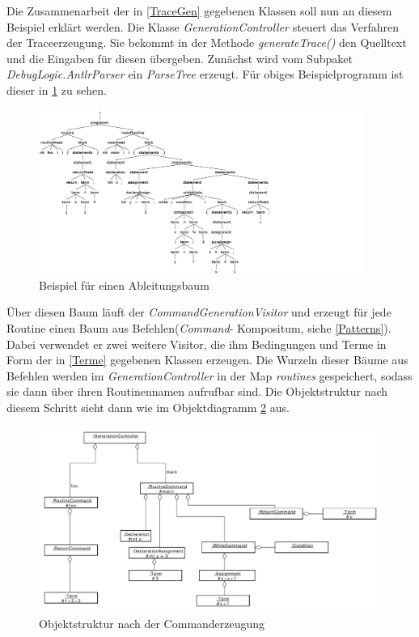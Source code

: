 \documentclass[parskip=full]{scrartcl}
\begin{document}
Die Zusammenarbeit der in \ref{TraceGen} gegebenen Klassen soll nun an diesem Beispiel erklärt werden. 
Die Klasse \textit{GenerationController} steuert das Verfahren der Traceerzeugung. Sie bekommt in der Methode \textit{generateTrace()} den Quelltext und die Eingaben für diesen übergeben. Zunächst wird vom Subpaket \textit{DebugLogic.AntlrParser} ein \textit{ParseTree} erzeugt. Für obiges Beispielprogramm ist dieser in \ref{ParseTreeExample} zu sehen.
\begin{figure}[!h]
\centering
\includegraphics[width=0.95\textwidth]{diagrammIdeenUmlet/parseTreeExample.png}
\caption{Beispiel für einen Ableitungsbaum}
\label{ParseTreeExample}
\end{figure}
Über diesen Baum läuft der \textit{CommandGenerationVisitor} und erzeugt für jede Routine einen Baum aus Befehlen(\textit{Command}- Kompositum, siehe \ref{Patterns}). Dabei verwendet er zwei weitere Visitor, die ihm Bedingungen und Terme in Form der in \ref{Terme} gegebenen Klassen erzeugen. 
Die Wurzeln dieser Bäume aus Befehlen werden im \textit{GenerationController} in der Map \textit{routines} gespeichert, sodass sie dann über ihren Routinennamen aufrufbar sind. Die Objektstruktur nach diesem Schritt sieht dann wie im Objektdiagramm \ref{CommandTreeExample} aus.
\begin{figure}[!h]
\includegraphics[width=1.2\textwidth]{diagrammIdeenUmlet/CommandTreeExample.pdf}
\caption{Objektstruktur nach der Commanderzeugung}
\label{CommandTreeExample}
\end{figure}
\end{document}
